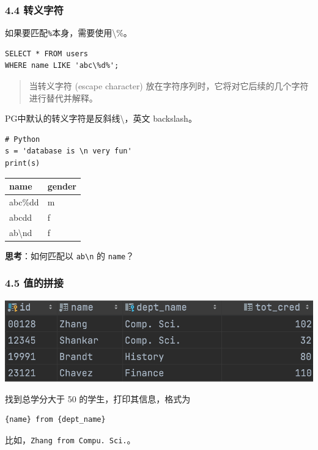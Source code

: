 \documentclass[aspectratio=169, 14pt]{beamer}
\begin{document}
\begin{frame}[fragile]
	\frametitle{4.4 转义字符}
	如果要匹配\texttt{\%}本身，需要使用\alert{\textbackslash\%}。
	\begin{verbatim} 
SELECT * FROM users
WHERE name LIKE 'abc\%d%';
\end{verbatim}
	\begin{quote}
		当\alert{转义字符} (escape character) 放在字符序列时，它将对它后续的几个字符进行替代并解释。
	\end{quote}

	PG中默认的转义字符是反斜线\textbackslash，英文 backslash。
\end{frame}

\begin{frame}[fragile]
	\begin{verbatim} 
# Python
s = 'database is \n very fun'
print(s)
    \end{verbatim}
	\pause
	\begin{table}
		\begin{tabular}{ll}
			\toprule
			name                & gender \\
			\midrule
			abc\%dd             & m      \\
			abcdd               & f      \\
			ab\textbackslash nd & f      \\
			\bottomrule
		\end{tabular}
	\end{table}
	{\large {}} \textbf{思考}：如何匹配以 \texttt{ab\textbackslash n} 的 \texttt{name}？
\end{frame}

\begin{frame}[fragile]
	\frametitle{4.5 值的拼接}
	\includegraphics[width=.8\textwidth]{week4/cred}

	找到总学分大于 50 的学生，打印其信息，格式为

	\begin{verbatim}
{name} from {dept_name}    
\end{verbatim}

	比如，\texttt{Zhang from Compu. Sci.}。
\end{frame}
\end{document}
